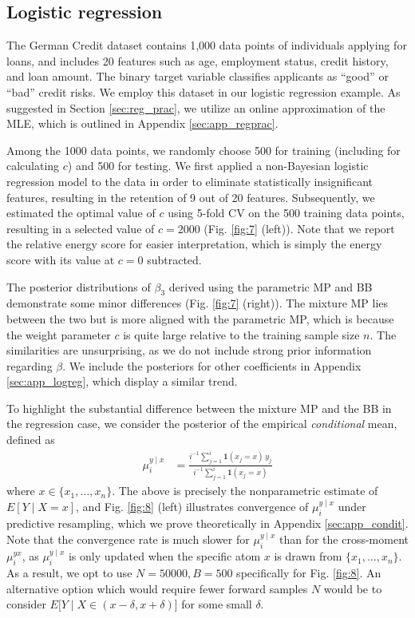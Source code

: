 \documentclass[11pt,a4paper]{article}
\theoremstyle{plain}
\theoremstyle{remark}
\theoremstyle{remark}
\begin{document}
\subsection{Logistic regression} \label{sec:logreg}
The German Credit dataset \citep{statlog_(german_credit_data)_144} contains 1,000 data points of individuals applying for loans, and includes 20 features such as age, employment status, credit history, and loan amount. The binary target variable classifies applicants as ``good'' or ``bad'' credit risks. We employ this dataset in our logistic regression example. As suggested in Section \ref{sec:reg_prac}, we utilize an online approximation of the MLE, which is outlined in Appendix \ref{sec:app_regprac}.

Among the 1000 data points, we randomly choose 500 for training (including for calculating $c$) and 500 for testing. We first applied a non-Bayesian logistic regression model to the data in order to eliminate statistically insignificant features, resulting in the retention of 9 out of 20 features. Subsequently, we estimated the optimal value of $c$ using 5-fold CV on the 500 training data points, resulting in a 
selected  value of $c = 2000$ (Fig. \ref{fig:7} (left)). Note that we report the relative energy score for easier interpretation, which is simply the energy score with its value at $c = 0$ subtracted.

The posterior distributions of $\beta_3$ derived using the parametric MP and BB demonstrate some minor differences (Fig. \ref{fig:7} (right)). The mixture MP lies between the two but is more aligned with the parametric MP, which is because the weight parameter $c$ is quite large relative to the training sample size $n$. The similarities are unsurprising, as we do not include strong prior information regarding $\beta$.
We include the posteriors for other coefficients in Appendix \ref{sec:app_logreg}, which display a similar trend.


To highlight the substantial difference between the mixture MP and the BB in the regression case, we consider the posterior of the empirical \textit{conditional} mean, defined as
\begin{align*}
{\mu}_i^{y \mid x} &= \frac{i^{-1}\sum_{j = 1}^{i}\mathbf{1}(x_j = x)\,  y_j}{i^{-1}\sum_{j = 1}^i \mathbf{1}(x_j = x)}
\end{align*}
where $x \in \{x_1,\ldots,x_n\}$. The above is precisely the nonparametric estimate of $E[Y \mid X = x]$, and Fig. \ref{fig:8} (left) illustrates convergence of $\mu_i^{y \mid x}$ under predictive resampling, which we prove theoretically in Appendix \ref{sec:app_condit}. 
 Note that the convergence rate is much slower for $\mu_i^{y \mid x}$ than for the cross-moment $\mu_i^{yx}$, as $\mu_i^{y \mid x}$ is only updated when the specific atom $x$ is drawn from $\{x_1,\ldots,x_n\}$. As a result, we opt to use $N = 50000, B = 500$ specifically for Fig. \ref{fig:8}. An alternative option which would require fewer forward samples $N$ would be to consider $E[Y \mid X \in (x - \delta, x+\delta)$] for some small $\delta$.
\end{document}
